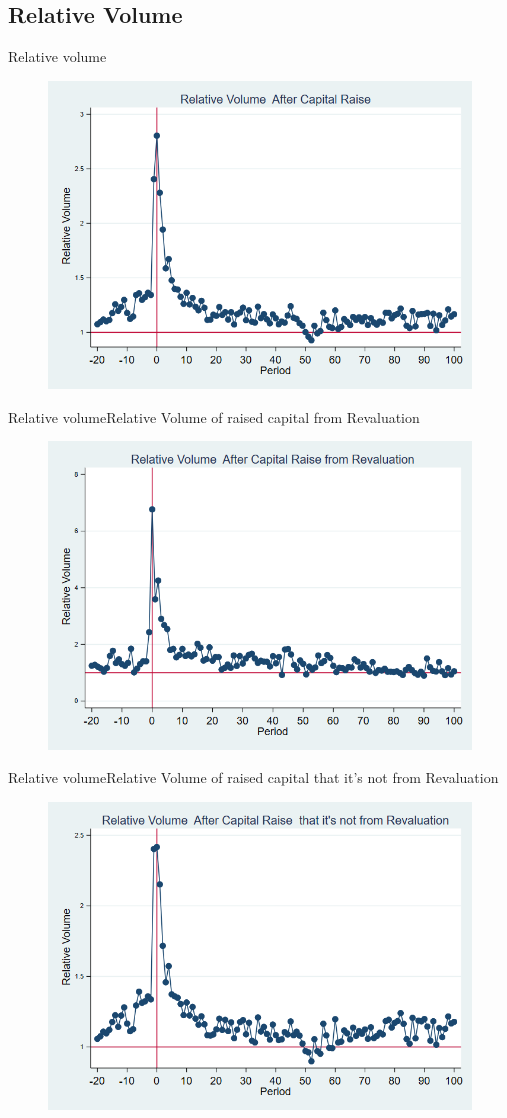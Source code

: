 \documentclass{beamer}
\begin{document}
\subsection{Relative Volume}
\begin{frame}{Relative volume}
\begin{figure}
\centering
\includegraphics[width=0.7\linewidth]{Relvolume}
\label{fig:relvolume}
\end{figure}
\end{frame}
\begin{frame}{Relative volume}{Relative Volume of raised capital from Revaluation}
\begin{figure}
\centering
\includegraphics[width=0.7\linewidth]{Relvolume_Revaluation}
\label{fig:relvolumerevaluation}
\end{figure}
\end{frame}
\begin{frame}{Relative volume}{Relative Volume of raised capital that it's not from Revaluation}
\begin{figure}
\centering
\includegraphics[width=0.7\linewidth]{Relvolume_NoRevaluation}
\label{fig:relvolumenorevaluation}
\end{figure}
\end{frame}
\end{document}
